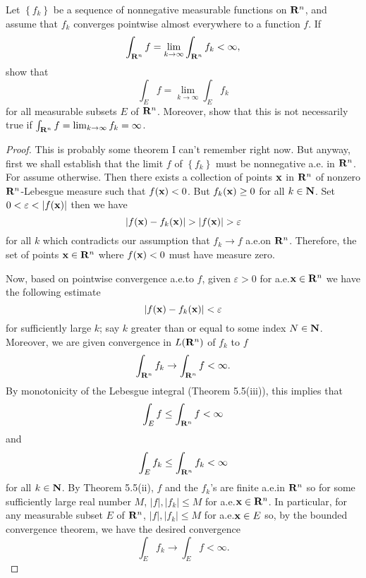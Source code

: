 \begin{problem}
Let $\left\{f_k\right\}$ be a sequence of nonnegative measurable functions
on $\mathbf{R}^n$, and assume that $f_k$ converges pointwise almost everywhere to
a function $f$. If
\[
\int_{\mathbf{R}^n} f=\lim_{k\to\infty}\int_{\mathbf{R}^n} f_k<\infty,
\]
show that
\[
\int_E f=\lim_{k\to\infty}\int_E f_k
\]
for all measurable subsets $E$ of $\mathbf{R}^n$. Moreover, show that this is not
necessarily true if $\int_{\mathbf{R}^n} f=\lim_{k\to\infty} f_k=\infty$.
\end{problem}
\begin{proof}
This is probably some theorem I can't remember right now. But anyway, first
we shall establish that the limit $f$ of $\left\{f_k\right\}$ must be
nonnegative a.e. in $\mathbf{R}^n$. For assume otherwise. Then there exists a
collection of points $\mathbf{x}$ in $\mathbf{R}^n$ of nonzero $\mathbf{R}^n$-Lebesgue
measure such that $f(\mathbf{x})<0$. But $f_k(\mathbf{x})\geq 0$ for all
$k\in\mathbf{N}$. Set $0<\varepsilon<|f(\bfx)|$ then we have
\begin{equation}
\label{eq:estimate-contradiction-1}
|f(\bfx)-f_k(\bfx)|>|f(\bfx)|>\varepsilon
\end{equation}
for all $k$ which contradicts our assumption that $f_k\to f$ a.e.\@ on
$\mathbf{R}^n$. Therefore, the set of points $\mathbf{x}\in\mathbf{R}^n$ where $f(\mathbf{x})<0$
must have measure zero.

Now, based on pointwise convergence a.e.\@ to $f$, given $\varepsilon>0$
for a.e.\@ $\mathbf{x}\in\mathbf{R}^n$ we have the following estimate
\begin{equation}
\label{eq:estimate-2}
|f(\mathbf{x})-f_k(\mathbf{x})|<\varepsilon
\end{equation}
for sufficiently large $k$; say $k$ greater than or equal to some index
$N\in\mathbf{N}$. Moreover, we are given convergence in $L(\mathbf{R}^n)$ of $f_k$ to
$f$
\begin{equation}
\label{eq:integral-estimate-1}
\int_{\mathbf{R}^n}f_k\to\int_{\mathbf{R}^n}f<\infty.
\end{equation}
By monotonicity of the Lebesgue integral (Theorem 5.5(iii)), this implies
that
\begin{equation}
\label{eq:estimate-monotonicity-2}
\int_E f\leq\int_{\mathbf{R}^n} f<\infty
\end{equation}
and
\begin{equation}
\label{eq:estimate-monotonicity-k-2}
\int_E f_k\leq\int_{\mathbf{R}^n}f_k<\infty
\end{equation}
for all $k\in\mathbf{N}$. By Theorem 5.5(ii), $f$ and the $f_k$'s are finite
a.e.\@ in $\mathbf{R}^n$ so for some sufficiently large real number $M$,
$|f|,|f_k|\leq M$ for a.e.\@ $\mathbf{x}\in\mathbf{R}^n$. In particular, for any
measurable subset $E$ of $\mathbf{R}^n$, $|f|,|f_k|\leq M$ for a.e.\@ $\mathbf{x}\in E$
so, by the bounded convergence theorem, we have the desired convergence
\begin{equation}
\label{eq:desired-convergence-2}
\int_E f_k\to\int_E f<\infty.
\end{equation}


\end{proof}
